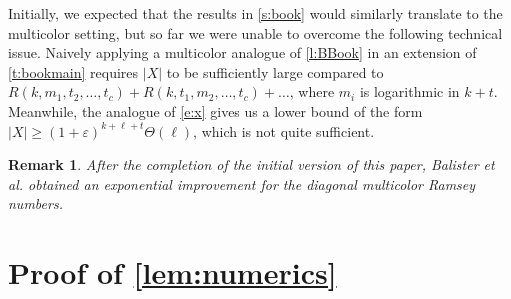 \documentclass[reqno,final,12pt]{amsart}
\newtheorem{rem}[thm]{Remark}
\newcommand{\eps}{\varepsilon}
\newcommand{\bl}[1]{\boldsymbol{#1}}
\begin{document}
\vskip 10pt

Initially, we expected that the results in \cref{s:book} would similarly translate to the multicolor setting, but so far we were unable to overcome the following technical issue. Naively applying a multicolor analogue of \cref{l:BBook} in an extension of \cref{t:bookmain} requires $|X|$ to be sufficiently large compared to $R(k, m_1, t_2,\ldots,t_c) + R(k,t_1,m_2,\ldots,t_c) + \ldots$, where $m_i$ is logarithmic in $k+t$.
Meanwhile, the analogue of \eqref{e:x} gives us a lower bound of the form $|X| \geq (1+\eps)^{k+\ell+t}\Theta(\bl{\ell})$, which is not quite sufficient. 

\begin{rem} After the completion of the initial version of this paper, Balister et al.\cite{BBCGHMRT} obtained an exponential improvement for the diagonal multicolor Ramsey numbers. 
\end{rem}




\appendix

\section{Proof of \cref{lem:numerics}}
\end{document}
